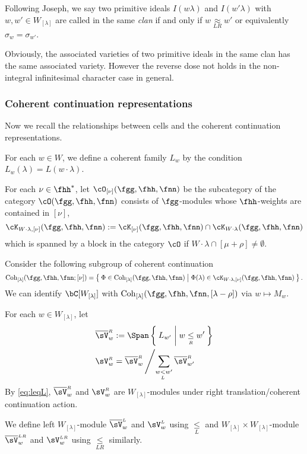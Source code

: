 \documentclass[12pt,a4paper]{amsart}
\numberwithin{equation}{section}
\theoremstyle{remark}
\def\WLam{W_{\Lam}}
\def\bVL{{\overline{\sV}}^{\scriptscriptstyle L}}
\def\bVR{{\overline{\sV}}^{\scriptscriptstyle R}}
\def\bVLR{{\overline{\sV}}^{\scriptscriptstyle LR}}
\def\VL{{\sV}^{\scriptscriptstyle L}}
\def\VR{{\sV}^{\scriptscriptstyle R}}
\def\VLR{{\sV}^{\scriptscriptstyle LR}}
\def\Coh{\mathrm{Coh}}
\def\lneqL{\mathrel{\mathop{<}\limits_{\scriptscriptstyle L}}}
\def\leqL{\mathrel{\mathop{\leq}\limits_{\scriptscriptstyle L}}}
\def\leqR{\mathrel{\mathop{\leq}\limits_{\scriptscriptstyle R}}}
\def\leqLR{\mathrel{\mathop{\leq}\limits_{\scriptscriptstyle LR}}}
\def\approxLR{\mathrel{\mathop{\approx}\limits_{\scriptscriptstyle LR}}}
\newcommand{\Lam}{{[\lambda]}}
\newcommand{\Grt}{\cK}
\begin{document}
Following Joseph, we say two primitive ideals $I(w\lambda)$ and $I(w'\lambda)$
with $w, w'\in \WLam$ are called in the same \emph{clan} if and only if
$w\approxLR w'$ or equivalently $\sigma_{w}=\sigma_{w'}$.

Obviously, the associated varieties of two primitive ideals in the same clan has
the same associated variety. However the reverse dose not holds in the
non-integral infinitesimal character case in general.

\subsubsection*{Coherent continuation representations}
Now we recall the relationships between cells and the coherent continuation
representations.

For each $w\in W$, we define a coherent family $L_{w}$ by the condition
$L_{w}(\lambda) = L(w\cdot \lambda)$.

For each $\nu\in \fhh^{*}$, let $\cO_{[\nu]}(\fgg,\fhh,\fnn)$ be the subcategory
of the category $\cO(\fgg,\fhh,\fnn)$ consists of $\fgg$-modules whose
$\fhh$-weights are contained in $[\nu]$,
\[
  \Grt_{W\cdot\lambda,[\nu]}(\fgg,\fhh,\fnn) := \Grt_{[\nu]}(\fgg,\fhh,\fnn)\cap \Grt_{W\cdot \lambda}(\fgg,\fhh,\fnn)
\]
which is spanned by a block in the category $\cO$ if
$W\cdot \lambda \cap [\mu+\rho]\neq \emptyset$.

Consider the following subgroup of coherent continuation
\[
  \Coh_{[\lambda]}(\fgg,\fhh,\fnn; [\nu]) = \Set{\Phi\in \Coh_{[\lambda]}(\fgg,\fhh,\fnn)| \Phi(\lambda) \in \Grt_{W\cdot \lambda, [\nu]}(\fgg,\fhh,\fnn) }.
\]
We can identify $\bC[\WLam]$ with $\Coh_{\Lam}(\fgg,\fhh,\fnn,[\lambda-\rho])$
via $w \mapsto M_{w}$.

For each $w\in W_{[\lambda]}$, let
\[
  \begin{split}
    \bVR_{w}& :=\Span\Set{L_{w'}|w\leqR w'} \\
    \VR_{w}&= \bVR _{w}\left/ \sum_{w\lneqL w'} \bVR_{w'} \right.
  \end{split}
\]
By \eqref{eq:leqL}, $\bVR_{w}$ and $\VR_{w}$ are $W_{[\lambda]}$-modules under
right translation/coherent continuation action.

We define left $W_{[\lambda]}$-module $\bVL_{w}$ and $\VL_{w}$ using $\leqL$ and
$W_{[\lambda]}\times W_{[\lambda]}$-module $\bVLR_{w}$ and $\VLR_{w}$ using
$\leqLR$ similarly.
\end{document}
